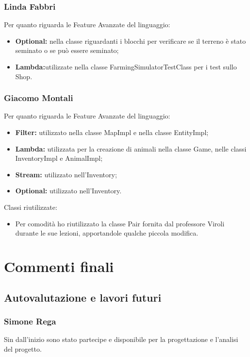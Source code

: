 \documentclass[a4paper,12pt]{report}
\begin{document}
\subsection{Linda Fabbri}
Per quanto riguarda le Feature Avanzate del linguaggio:
\begin{itemize}
	\item \textbf{Optional: }nella classe riguardanti i blocchi per verificare se il terreno è stato seminato o se può essere seminato;
	\item \textbf{Lambda:}utilizzate nella classe FarmingSimulatorTestClass per i test sullo Shop.
\end{itemize}


\subsection{Giacomo Montali}
Per quanto riguarda le Feature Avanzate del linguaggio:
\begin{itemize}
	\item \textbf{Filter:} utilizzato nella classe MapImpl e nella classe EntityImpl;
	\item \textbf{Lambda:} utilizzata per la creazione di animali nella classe Game, nelle classi InventoryImpl e AnimalImpl;
	\item \textbf{Stream:} utilizzato nell’Inventory;
	\item \textbf{Optional:} utilizzato nell’Inventory.
\end{itemize}
Classi riutilizzate:
\begin{itemize}
	\item Per comodità ho riutilizzato la classe Pair fornita dal professore Viroli durante le sue lezioni, apportandole qualche piccola modifica.
\end{itemize}

\chapter{Commenti finali}


\section{Autovalutazione e lavori futuri}

\subsection{Simone Rega}
Sin dall'inizio sono stato partecipe e disponibile per la progettazione e l'analisi del progetto. 
\end{document}
